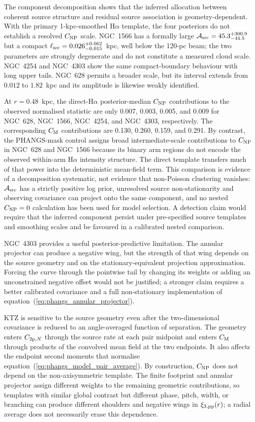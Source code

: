 \documentclass[fleqn,usenatbib]{mnras}
\begin{document}
The component decomposition shows that the inferred allocation between coherent source structure and residual source association is geometry-dependent.  With the primary 1-kpc-smoothed H$\alpha$ template, the four posteriors do not establish a resolved $C_{\rm NP}$ scale.  NGC~1566 has a formally large ${\cal A}_{\rm src}=45.3^{+300.9}_{-44.5}$ but a compact $\ell_{\rm src}=0.026^{+0.062}_{-0.015}$~kpc, well below the 120-pc beam; the two parameters are strongly degenerate and do not constitute a measured cloud scale.  NGC~4254 and NGC~4303 show the same compact-boundary behaviour with long upper tails.  NGC~628 permits a broader scale, but its interval extends from $0.012$ to $1.82$~kpc and its amplitude is likewise weakly identified.

At $r=0.48$~kpc, the direct-H$\alpha$ posterior-median $C_{\rm NP}$ contributions to the observed normalised statistic are only 0.007, 0.003, 0.005, and 0.009 for NGC~628, NGC~1566, NGC~4254, and NGC~4303, respectively.  The corresponding $C_{\rm M}$ contributions are 0.130, 0.260, 0.159, and 0.291.  By contrast, the PHANGS-mask control assigns broad intermediate-scale contributions to $C_{\rm NP}$ in NGC~628 and NGC~1566 because its binary arm regions do not encode the observed within-arm H$\alpha$ intensity structure.  The direct template transfers much of that power into the deterministic mean-field term.  This comparison is evidence of a decomposition systematic, not evidence that non-Poisson clustering vanishes: ${\cal A}_{\rm src}$ has a strictly positive log prior, unresolved source non-stationarity and observing covariance can project onto the same component, and no nested $C_{\rm NP}=0$ calculation has been used for model selection.  A detection claim would require that the inferred component persist under pre-specified source templates and smoothing scales and be favoured in a calibrated nested comparison.

NGC~4303 provides a useful posterior-predictive limitation.  The annular projector can produce a negative wing, but the strength of that wing depends on the source geometry and on the stationary-equivalent projection approximation.  Forcing the curve through the pointwise tail by changing its weights or adding an unconstrained negative offset would not be justified; a stronger claim requires a better calibrated covariance and a full non-stationary implementation of equation~(\ref{eq:phangs_annular_projector}).

KTZ is sensitive to the source geometry even after the two-dimensional covariance is reduced to an angle-averaged function of separation.  The geometry enters $C_{{\rm 2p},N}$ through the source rate at each pair midpoint and enters $C_{\rm M}$ through products of the convolved mean field at the two endpoints.  It also affects the endpoint second moments that normalise equation~(\ref{eq:phangs_model_pair_average}).  By construction, $C_{\rm NP}$ does not depend on the non-axisymmetric template.  The finite footprint and annular projector assign different weights to the remaining geometric contributions, so templates with similar global contrast but different phase, pitch, width, or branching can produce different shoulders and negative wings in $\xi_{3,{\rm pp}}(r)$; a radial average does not necessarily erase this dependence.
\end{document}

